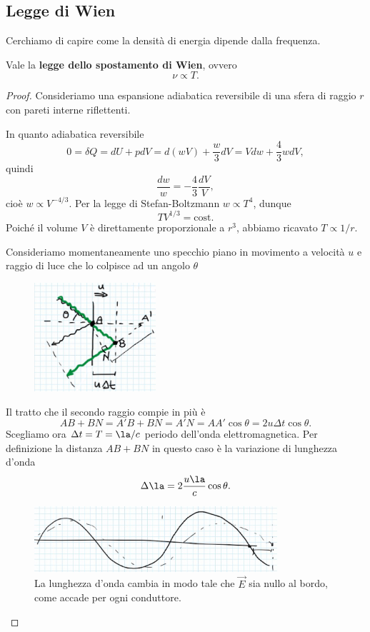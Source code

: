 \subsection{Legge di Wien}
Cerchiamo di capire come la densit\`a di energia dipende dalla frequenza.

\begin{proposition}\label{LeggeSpostamentoWien}
Vale la \textbf{legge dello spostamento di Wien}, ovvero
\[\nu\propto T.\]
\end{proposition}
\begin{proof}
Consideriamo una espansione adiabatica reversibile di una sfera di raggio $r$ con pareti interne riflettenti.\medskip

\noindent
In quanto adiabatica reversibile
\[0=\delta Q=dU+pdV=d(wV)+\frac w3 dV=Vdw+\frac 43wdV,\]
quindi
\[\frac{dw}w=-\frac43\frac{dV}V,\]
cio\`e $w\propto V^{-4/3}$. Per la legge di Stefan-Boltzmann $w\propto T^4$, dunque
\[TV^{1/3}=\text{cost.}\]
Poich\'e il volume $V$ \`e direttamente proporzionale a $r^3$, abbiamo ricavato $T\propto 1/r$.

\noindent
Consideriamo momentaneamente uno specchio piano in movimento a velocit\`a $u$ e raggio di luce che lo colpisce ad un angolo $\theta$

\begin{figure}[!htb]
    \centering
    \includegraphics[width=4.5cm]{images/movimento_specchio.png}
\end{figure}\newpage

\noindent
Il tratto che il secondo raggio compie in pi\`u \`e 
\[AB+BN=A'B+BN=A'N=AA'\cos \theta=2u\Delta t \cos \theta.\]
Scegliamo ora $\Delta t=T=\la/c$ periodo dell'onda elettromagnetica. Per definizione la distanza $AB+BN$ in questo caso \`e la variazione di lunghezza d'onda
\[\Delta \la=2\frac {u\la} c\cos \theta.\]
\begin{figure}[!htb]
    \centering
    \includegraphics[width=9cm]{images/cambiamento_lunghezza_onda.png}
    \caption{La lunghezza d'onda cambia in modo tale che $\vec E$ sia nullo al bordo, come accade per ogni conduttore.}
\end{figure}


\end{proof}
